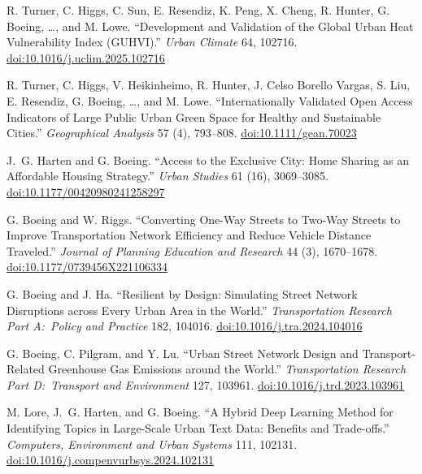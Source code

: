 \documentclass[11pt,a4paper]{report} %
\begin{document}
\begin{tablist}
\item[2025] \tab{}R. Turner, C. Higgs, C. Sun, E. Resendiz, K. Peng, X. Cheng, R. Hunter, G. Boeing, \ldots, and M. Lowe. \enquote{Development and Validation of the Global Urban Heat Vulnerability Index (GUHVI).} \textit{Urban Climate} 64, 102716. \href{https://doi.org/10.1016/j.uclim.2025.102716}{doi:10.1016/j.uclim.2025.102716}

\item[2025] \tab{}R. Turner, C. Higgs, V. Heikinheimo, R. Hunter, J. Celso Borello Vargas, S. Liu, E. Resendiz, G. Boeing, \ldots, and M. Lowe. \enquote{Internationally Validated Open Access Indicators of Large Public Urban Green Space for Healthy and Sustainable Cities.} \textit{Geographical Analysis} 57 (4), 793--808. \href{https://doi.org/10.1111/gean.70023}{doi:10.1111/gean.70023}

\item[2024] \tab{}J.~G. Harten and G. Boeing. \enquote{Access to the Exclusive City: Home Sharing as an Affordable Housing Strategy.} \textit{Urban Studies} 61 (16), 3069--3085. \href{https://doi.org/10.1177/00420980241258297}{doi:10.1177/00420980241258297}

\item[2024] \tab{}G. Boeing and W. Riggs. \enquote{Converting One-Way Streets to Two-Way Streets to Improve Transportation Network Efficiency and Reduce Vehicle Distance Traveled.} \textit{Journal of Planning Education and Research} 44 (3), 1670--1678. \href{https://doi.org/10.1177/0739456X221106334}{doi:10.1177/0739456X221106334}

\item[2024] \tab{}G. Boeing and J. Ha. \enquote{Resilient by Design: Simulating Street Network Disruptions across Every Urban Area in the World.} \textit{Transportation Research Part A:\ Policy and Practice} 182, 104016. \href{https://doi.org/10.1016/j.tra.2024.104016}{doi:10.1016/j.tra.2024.104016}

\item[2024] \tab{}G. Boeing, C. Pilgram, and Y. Lu. \enquote{Urban Street Network Design and Transport-Related Greenhouse Gas Emissions around the World.} \textit{Transportation Research Part D:\ Transport and Environment} 127, 103961. \href{https://doi.org/10.1016/j.trd.2023.103961}{doi:10.1016/j.trd.2023.103961}

\item[2024] \tab{}M. Lore, J.~G. Harten, and G. Boeing. \enquote{A Hybrid Deep Learning Method for Identifying Topics in Large-Scale Urban Text Data: Benefits and Trade-offs.} \textit{Computers, Environment and Urban Systems} 111, 102131. \href{https://doi.org/10.1016/j.compenvurbsys.2024.102131}{doi:10.1016/j.compenvurbsys.2024.102131}


\end{tablist}
\end{document}
